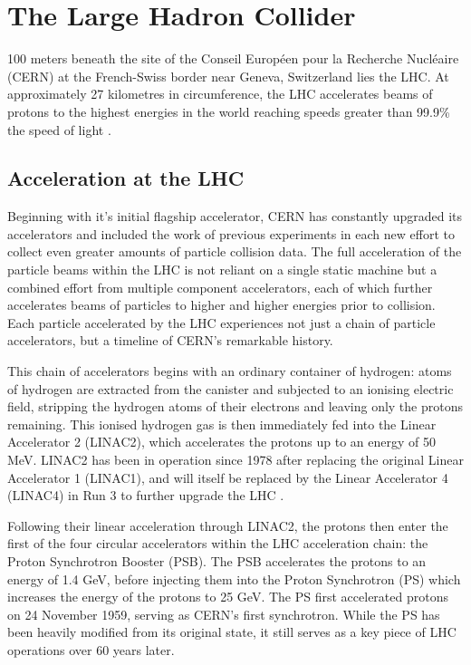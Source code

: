 \documentclass[12pt,a4paper,epsf,portrait,times,epsfig]{report}
\begin{document}
		\section{The Large Hadron Collider}

		100 meters beneath the site of the Conseil Européen pour la Recherche Nucléaire (CERN) at the French-Swiss border near Geneva, Switzerland lies the LHC. At approximately 27 kilometres in circumference, the LHC accelerates beams of protons to the highest energies in the world 
		reaching speeds greater than 99.9\% the speed of light \cite{LHCDesignV1, LHCDesignV2, LHCDesignV3}. 

		\subsection{Acceleration at the LHC}

		Beginning with it's initial flagship accelerator, CERN has constantly upgraded its accelerators and included the work of previous experiments in each new effort to collect even greater amounts of particle collision data. The full acceleration of the particle beams within the LHC is not reliant on a single static machine but a combined effort from multiple component accelerators, each of which further accelerates beams of particles to higher and higher energies prior to collision. Each particle accelerated by the LHC experiences not just a chain of particle accelerators, but a timeline of CERN's remarkable history.   
		
		This chain of accelerators begins with an ordinary container of hydrogen: atoms of hydrogen are extracted from the canister and subjected to an ionising electric field, stripping the hydrogen atoms of their electrons and leaving only the protons remaining. This ionised hydrogen gas is then immediately fed into the Linear Accelerator 2 (LINAC2), which accelerates the protons up to an energy of 50 MeV. LINAC2 has been in operation since 1978 after replacing the original Linear Accelerator 1 (LINAC1), and will itself be replaced by the Linear Accelerator 4 (LINAC4) in Run 3 to further upgrade the LHC \cite{LINAC4}. \par 
		
		Following their linear acceleration through LINAC2, the protons then enter the first of the four circular accelerators within the LHC acceleration chain: the Proton Synchrotron Booster (PSB). The PSB accelerates the protons to an energy of 1.4 GeV, before injecting them into the Proton Synchrotron (PS) which increases the energy of the protons to 25 GeV. The PS first accelerated protons on 24 November 1959, serving as CERN's first synchrotron. While the PS has been heavily modified from its original state, it still serves as a key piece of LHC operations over 60 years later. \par
\end{document}
